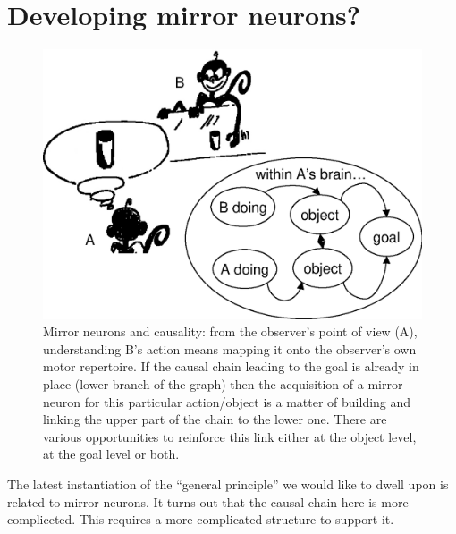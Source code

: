 
\section{Developing mirror neurons?}

\begin{figure}[tb]
\begin{center}
\includegraphics[width=\columnwidth]{mirror-monkey.eps}
\caption{ 
\label{fig:mirror-monkey}
%
Mirror neurons and causality: from the observer's point
of view (A), understanding B's action means mapping it onto the
observer's own
motor repertoire. If the causal chain leading to the goal is already
in place (lower branch of the graph) then the acquisition of a
mirror neuron for this particular action/object is a matter of
building and linking the upper part of the chain to the lower one.
There are various opportunities to reinforce this link either at the object
level, at the goal level or both. 
%
}
\end{center}
\end{figure}

\ifverbose
The latest instantiation of the ``general principle'' we would like to
dwell upon is related to mirror neurons. It turns out that the causal
chain here is more compliceted. This requires a more complicated
structure to support it.
\fi

